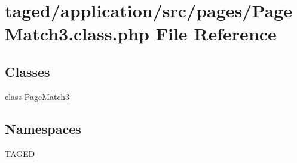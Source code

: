 \hypertarget{_page_match3_8class_8php}{}\section{taged/application/src/pages/\+Page\+Match3.class.\+php File Reference}
\label{_page_match3_8class_8php}
\subsection*{Classes}
\begin{DoxyCompactItemize}
\item 
class \hyperlink{class_page_match3}{Page\+Match3}
\end{DoxyCompactItemize}
\subsection*{Namespaces}
\begin{DoxyCompactItemize}
\item 
 \hyperlink{namespace_t_a_g_e_d}{T\+A\+G\+ED}
\end{DoxyCompactItemize}
